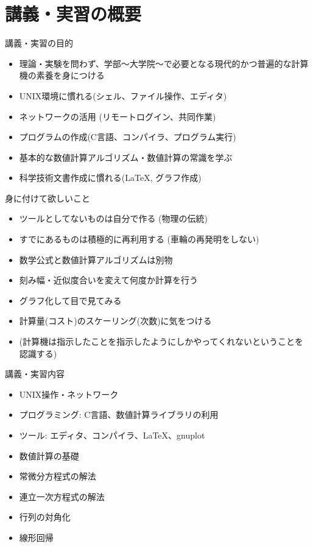 \section{講義・実習の概要}

\begin{frame}[t]{講義・実習の目的}
  \begin{itemize}
  \item 理論・実験を問わず、学部〜大学院〜で必要となる現代的かつ普遍的な計算機の素養を身につける
  \item UNIX環境に慣れる(シェル、ファイル操作、エディタ)
  \item ネットワークの活用 (リモートログイン、共同作業)
  \item プログラムの作成(C言語、コンパイラ、プログラム実行)
  \item 基本的な数値計算アルゴリズム・数値計算の常識を学ぶ
  \item 科学技術文書作成に慣れる(\LaTeX, グラフ作成)
  \end{itemize}
\end{frame}

\begin{frame}[t]{身に付けて欲しいこと}
  \begin{itemize}
  \item ツールとしてないものは自分で作る (物理の伝統)
  \item すでにあるものは積極的に再利用する (車輪の再発明をしない)
  \item 数学公式と数値計算アルゴリズムは別物
  \item 刻み幅・近似度合いを変えて何度か計算を行う
  \item グラフ化して目で見てみる
  \item 計算量(コスト)のスケーリング(次数)に気をつける
  \item (計算機は指示したことを指示したようにしかやってくれないということを認識する)
  \end{itemize}
\end{frame}

\begin{frame}[t]{講義・実習内容}
  \begin{itemize}
  \item UNIX操作・ネットワーク
  \item プログラミング: C言語、数値計算ライブラリの利用
  \item ツール: エディタ、コンパイラ、\LaTeX、gnuplot
  \item 数値計算の基礎
  \item 常微分方程式の解法
  \item 連立一次方程式の解法
  \item 行列の対角化
  \item 線形回帰
  \end{itemize}
\end{frame}

